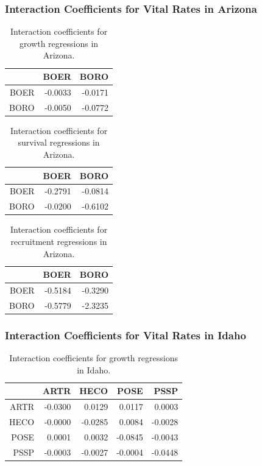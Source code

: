 \documentclass[12pt,]{article}
\begin{document}
\newpage{}

\subsubsection{Interaction Coefficients for Vital Rates in Arizona}

\begin{table}[ht]
\centering
\caption{Interaction coefficients for growth regressions in Arizona.} 
\begin{tabular}{rrr}
  \hline
 & BOER & BORO \\ 
  \hline
BOER & -0.0033 & -0.0171 \\ 
  BORO & -0.0050 & -0.0772 \\ 
   \hline
\end{tabular}
\end{table}

\begin{table}[ht]
\centering
\caption{Interaction coefficients for survival regressions in Arizona.} 
\begin{tabular}{rrr}
  \hline
 & BOER & BORO \\ 
  \hline
BOER & -0.2791 & -0.0814 \\ 
  BORO & -0.0200 & -0.6102 \\ 
   \hline
\end{tabular}
\end{table}

\begin{table}[ht]
\centering
\caption{Interaction coefficients for recruitment regressions in Arizona.} 
\begin{tabular}{rrr}
  \hline
 & BOER & BORO \\ 
  \hline
BOER & -0.5184 & -0.3290 \\ 
  BORO & -0.5779 & -2.3235 \\ 
   \hline
\end{tabular}
\end{table}



\newpage{}

\subsubsection{Interaction Coefficients for Vital Rates in Idaho}

\begin{table}[ht]
\centering
\caption{Interaction coefficients for growth regressions in Idaho.} 
\begin{tabular}{rrrrr}
  \hline
 & ARTR & HECO & POSE & PSSP \\ 
  \hline
ARTR & -0.0300 & 0.0129 & 0.0117 & 0.0003 \\ 
  HECO & -0.0000 & -0.0285 & 0.0084 & -0.0028 \\ 
  POSE & 0.0001 & 0.0032 & -0.0845 & -0.0043 \\ 
  PSSP & -0.0003 & -0.0027 & -0.0004 & -0.0448 \\ 
   \hline
\end{tabular}
\end{table}
\end{document}
